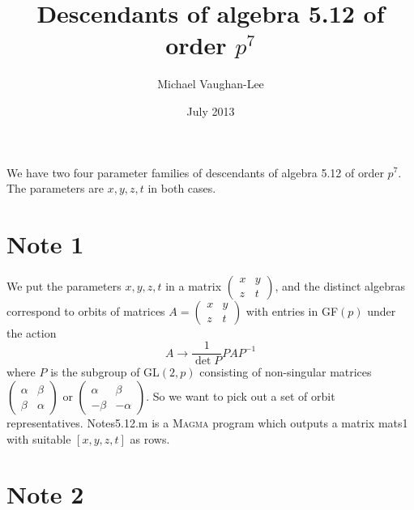\documentclass[12pt]{article}
\begin{document}
\title{Descendants of algebra 5.12 of order $p^{7}$}
\author{Michael Vaughan-Lee}
\date{July 2013}
\maketitle

We have two four parameter families of descendants of algebra 5.12 of order $%
p^{7}$. The parameters are $x,y,z,t$ in both cases.

\section{Note 1}

We put the parameters $x,y,z,t$ in a matrix $\left( 
\begin{array}{ll}
x & y \\ 
z & t%
\end{array}%
\right) $, and the distinct algebras correspond to orbits of matrices $%
A=\left( 
\begin{array}{ll}
x & y \\ 
z & t%
\end{array}%
\right) $ with entries in GF$(p)$ under the action%
\[
A\rightarrow \frac{1}{\det P}PAP^{-1}
\]%
where $P$ is the subgroup of GL$(2,p)$ consisting of non-singular matrices $%
\left( 
\begin{array}{ll}
\alpha  & \beta  \\ 
\beta  & \alpha 
\end{array}%
\right) $ or $\left( 
\begin{array}{ll}
\alpha  & \beta  \\ 
-\beta  & -\alpha 
\end{array}%
\right) $. So we want to pick out a set of orbit representatives.
Notes5.12.m is a \textsc{Magma} program which outputs a matrix mats1 with
suitable $[x,y,z,t]$ as rows.

\section{Note 2}
\end{document}
